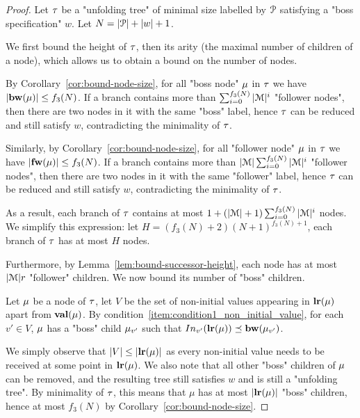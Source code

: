 \begin{proof}
	Let $\tau$ be a "unfolding tree" of minimal size labelled by $\mathcal{P}$ satisfying a "boss specification" $w$. Let $N = |\mathcal{P}| + |w|+1$.
	
	We first bound the height of $\tau$, then its arity (the maximal number of children of a node), which allows us to obtain a bound on the number of nodes.
	
	By Corollary~\ref{cor:bound-node-size}, for all "boss node" $\mu$ in $\tau$ we have $|\mathbf{bw}(\mu)| \leq f_3(N)$.
	If a branch contains more than $\sum_{i=0}^{f_3(N)}|\mathcal{M}|^{i}$ "follower nodes", then there are two nodes in it with the same "boss" label, hence $\tau$ can be reduced and still satisfy $w$, contradicting the minimality of $\tau$.
	
	Similarly, by Corollary~\ref{cor:bound-node-size}, for all "follower node" $\mu$ in $\tau$ we have $|\mathbf{fw}(\mu)| \leq f_3(N)$.
	If a branch contains more than $|\mathcal{M}|\sum_{i=0}^{f_3(N)}|\mathcal{M}|^{i}$ "follower nodes", then there are two nodes in it with the same "follower" label, hence $\tau$ can be reduced and still satisfy $w$, contradicting the minimality of $\tau$.
	
	As a result, each branch of $\tau$ contains at most $1+ (|\mathcal{M}|+1) \sum_{i=0}^{f_3(N)}|\mathcal{M}|^{i}$ nodes. We simplify this expression: let $H = (f_3(N)+2)(N+1)^{f_3(N)+1}$, each branch of $\tau$ has at most $H$ nodes.
	
	Furthermore, by Lemma~\ref{lem:bound-successor-height}, each node has at most $|\mathcal{M}|r$ "follower" children. We now bound its number of "boss" children.
	
	Let $\mu$ be a node of $\tau$, let $V$ be the set of non-initial values appearing in $\mathbf{lr}(\mu)$ apart from $\mathbf{val}(\mu)$.
	By condition~\ref{item:condition1_non_initial_value}, for each $v' \in V$, $\mu$ has a "boss" child $\mu_{v'}$ such that $\vinput{v'}{\localrunlabel{\node}} \subword \bosslabel{\node_{v'}}$.
	
	We simply observe that $|V| \leq |\mathbf{lr}(\mu)|$ as every non-initial value needs to be received at some point in $\mathbf{lr}(\mu)$. We also note that all other "boss" children of $\mu$ can be removed, and the resulting tree still satisfies $w$ and is still a "unfolding tree". By minimality of $\tau$, this means that $\mu$ has at most $|\mathbf{lr}(\mu)|$ "boss" children, hence at most $f_3(N)$ by Corollary~\ref{cor:bound-node-size}.
	

\end{proof}

